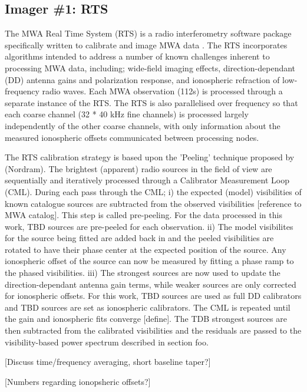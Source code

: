 \subsection{Imager \#1: RTS}
The MWA Real Time System (RTS) is a radio interferometry software package specifically written to calibrate and image MWA data \citep[][Mitchell et al. in prep]{dale_Cappallo_Morales_Ord_2008}. The RTS incorporates algorithms intended to address a number of known challenges inherent to processing MWA data, including; wide-field imaging effects, direction-dependant (DD) antenna gains and polarization response, and ionospheric refraction of low-frequency radio waves. Each MWA observation (112s) is processed through a separate instance of the RTS. The RTS is also parallelised over frequency so that each coarse channel (32 * 40 kHz fine channels) is processed largely independently of the other coarse channels, with only information about the measured ionospheric offsets communicated between processing nodes.  

The RTS calibration strategy is based upon the 'Peeling' technique proposed by (Nordram)\citep{10.1117/12.544262}. The brightest (apparent) radio sources in the field of view are sequentially and iteratively processed through a Calibrator Measurement Loop (CML). During each pass through the CML; i) the expected (model) visibilities of known catalogue sources are subtracted from the observed visibilities [reference to MWA catalog]. This step is called pre-peeling. For the data processed in this work, TBD sources are pre-peeled for each observation. ii) The model visibilites for the source being fitted are added back in and the peeled visibilities are rotated to have their phase center at the expected position of the source. Any ionospheric offset of the source can now be measured by fitting a phase ramp to the phased visibilities. iii) The strongest sources are now used to update the direction-dependant antenna gain terms, while weaker sources are only corrected for ionospheric offsets. For this work, TBD sources are used as full DD calibrators and TBD sources are set as ionospheric calibrators. The CML is repeated until the gain and ionospheric fits converge [define]. The TDB strongest sources are then subtracted from the calibrated visibilities and the residuals are passed to the visibility-based power spectrum described in section foo.

[Discuss time/frequency averaging, short baseline taper?]

[Numbers regarding ionopsheric offsets?]

